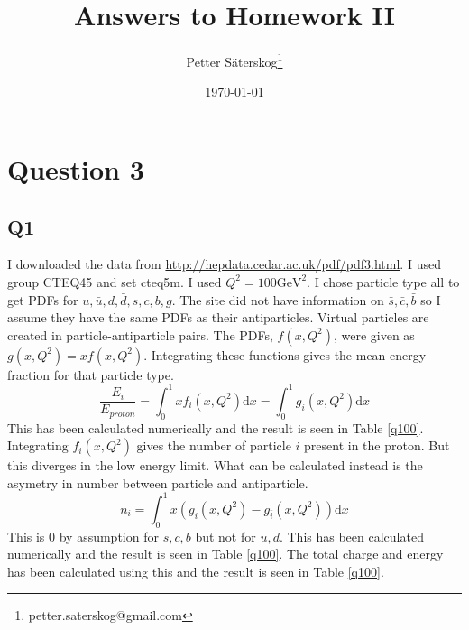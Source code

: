 \documentclass[a4paper,10pt]{article}
\title{Answers to Homework II}
\author{Petter S\"{a}terskog\footnote{petter.saterskog@gmail.com}}
\date{\today}
\begin{document}
\maketitle

\section{Question 3}
\subsection{Q1}
I downloaded the data from \url{http://hepdata.cedar.ac.uk/pdf/pdf3.html}. I used group CTEQ45 and set cteq5m. I used $Q^2=100 \mathrm{GeV}^2$. I chose particle type all to get PDFs for $u, \bar{u}, d, \bar{d}, s, c, b, g$. The site did not have information on $\bar{s}, \bar{c}, \bar{b}$ so I assume they have the same PDFs as their antiparticles. Virtual particles are created in particle-antiparticle pairs. The PDFs, $f(x,Q^2)$, were given as $g(x,Q^2)=xf(x,Q^2)$. Integrating these functions gives the mean energy fraction for that particle type.
\begin{equation}
 \frac{E_i}{E_{proton}}=\int_0^1xf_i(x,Q^2)\mathrm{d}x=\int_0^1g_i(x,Q^2)\mathrm{d}x
\end{equation}
This has been calculated numerically and the result is seen in Table \ref{q100}.\\
Integrating $f_i(x,Q^2)$ gives the number of particle $i$ present in the proton. But this diverges in the low energy limit. What can be calculated instead is the asymetry in number between particle and antiparticle.
\begin{equation}
 n_i=\int_0^1x(g_i(x,Q^2)-g_{\bar{i}}(x,Q^2))\mathrm{d}x
\end{equation}
This is 0 by assumption for $s, c, b$ but not for $u, d$. This has been calculated numerically and the result is seen in Table \ref{q100}. The total charge and energy has been calculated using this and the result is seen in Table \ref{q100}.
\end{document}
